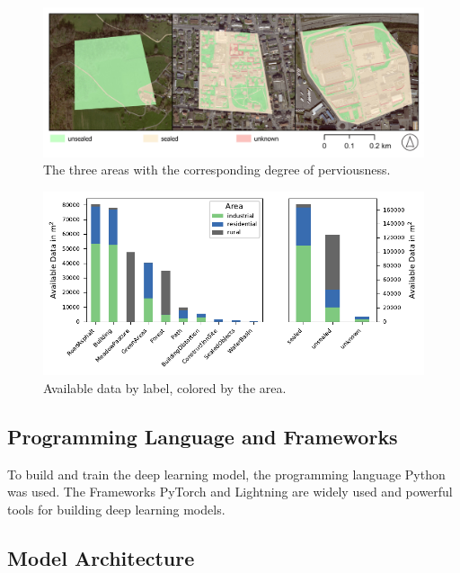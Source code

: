 \begin{figure}[H]
    \centering
    \captionsetup{width=0.8\linewidth}
    \includegraphics[width=\linewidth]{figures/map_aoi_sealing.pdf}
    \caption{The three areas with the corresponding degree of perviousness.}
    \label{fig:sealed_areas}
\end{figure}

\begin{figure}[H]
    \centering
    \captionsetup{width=0.8\linewidth}
    \includegraphics{figures/area_by_category_and_seal.pdf}
    \caption{Available data by label, colored by the area.}
    \label{fig:label_distribution}
\end{figure}


\subsection{Programming Language and Frameworks}%

To build and train the deep learning model, the programming language Python was used.
The Frameworks PyTorch and Lightning are widely used and powerful tools for building
deep learning models.


\subsection{Model Architecture}%

